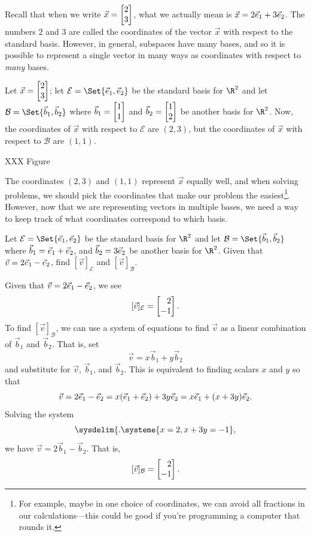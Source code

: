 
Recall that when we write $\vec x=\mat{2\\3}$, what we actually mean is $\vec x=2{\vec e_1}+3{\vec e_2}$. The numbers $2$
and $3$ are called the coordinates of the vector $\vec x$ with respect to the standard basis.  However, in general,
subspaces have many bases, and so it is possible to represent a single vector in many ways as coordinates with
respect to \emph{many} bases.

Let $\vec x=\mat{2\\3}$; let $\mathcal E=\Set{\xhat,\yhat}$ be the standard basis for $\R^2$ and let
$\mathcal B=\Set{\vec b_1,\vec b_2}$ where $\vec b_1=\mat{1\\1}$ and $\vec b_2=\mat{1\\2}$ be another
basis for $\R^2$. Now, the coordinates of $\vec x$ with respect to $\mathcal E$ are $(2,3)$, but
the coordinates of $\vec x$ with respect to $\mathcal B$ are $(1,1)$.

XXX Figure

The coordinates $(2,3)$ and $(1,1)$ represent $\vec x$ equally well, and when solving problems, we should pick the
coordinates that make our problem the easiest\footnote{ For example, maybe in one choice of coordinates, we can avoid all 
fractions in our calculations---this could be good if you're programming a computer that rounds it.}. However, now that we
are representing vectors in multiple bases, we need a way to keep track of what coordinates correspond to which basis.


\begin{example}
	Let $\mathcal E=\Set{\xhat,\yhat}$ be the standard basis for $\R^2$ and let $\mathcal B=\Set{\vec b_1,\vec b_2}$
	where $\vec b_1={\vec e_1}+{\vec e_2}$, and $\vec b_2 =3{\vec e_2}$ be another basis for $\R^2$. Given that $\vec v=2{\vec e_1}-{\vec e_2}$, 
	find $[\vec v]_{\mathcal E}$ and $[\vec v]_{\mathcal B}$.

	Given that $\vec v=2{\vec e_1}-{\vec e_2}$, we see
	\[
	    [\vec v]_{\mathcal E}=\mat{2\\-1}.
	\]
	To find $[\vec v]_{\mathcal B}$, we can use a system of equations to find $\vec v$ as a linear combination of $\vec b_1$ and $\vec b_2$. That is, set 
	\[
	    \vec v = x\vec b_1 + y\vec b_2
	\]
	and substitute for $\vec v$, $\vec b_1$, and $\vec b_2$. This is equivalent to finding scalars $x$ and $y$ so that
	\[
	    \vec v = 2{\vec e_1}-{\vec e_2}=x({\vec e_1}+{\vec e_2})+3y{\vec e_2}=x{\vec e_1}+(x+3y){\vec e_2}.
	\]
	Solving the system 
	\[
	    \sysdelim\{.
		\systeme{
			x=2,
			x+3y=-1
		},
	\]
	we have $\vec v=2\vec b_1 - \vec b_2$. That is,
	\[
	   [\vec v]_{\mathcal B}=\mat{2\\-1}. 
	\]
\end{example}

